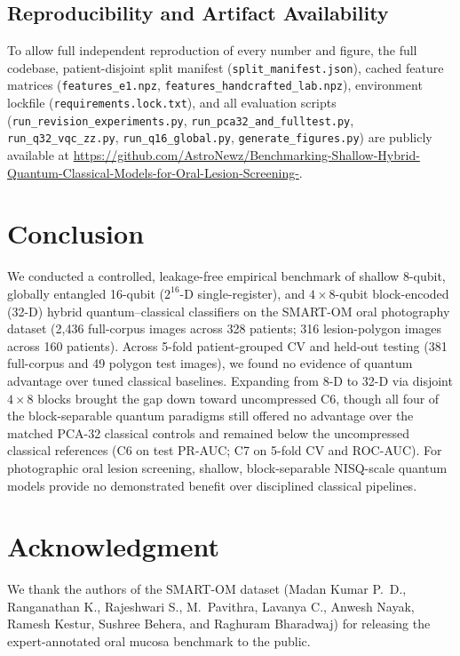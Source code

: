 \documentclass[conference]{IEEEtran}
\begin{document}
\subsection*{Reproducibility and Artifact Availability}
To allow full independent reproduction of every number and figure, the full codebase, patient-disjoint split manifest (\texttt{split\_manifest.json}), cached feature matrices (\texttt{features\_e1.npz}, \texttt{features\_handcrafted\_lab.npz}), environment lockfile (\texttt{requirements.lock.txt}), and all evaluation scripts (\texttt{run\_revision\_experiments.py}, \texttt{run\_pca32\_and\_fulltest.py}, \texttt{run\_q32\_vqc\_zz.py}, \texttt{run\_q16\_global.py}, \texttt{generate\_figures.py}) are publicly available at \url{https://github.com/AstroNewz/Benchmarking-Shallow-Hybrid-Quantum-Classical-Models-for-Oral-Lesion-Screening-}.

\section{Conclusion}
We conducted a controlled, leakage-free empirical benchmark of shallow 8-qubit, globally entangled 16-qubit ($2^{16}$-D single-register), and $4 \times 8$-qubit block-encoded (32-D) hybrid quantum--classical classifiers on the SMART-OM oral photography dataset (2,436 full-corpus images across 328 patients; 316 lesion-polygon images across 160 patients). Across 5-fold patient-grouped CV and held-out testing (381 full-corpus and 49 polygon test images), we found no evidence of quantum advantage over tuned classical baselines. Expanding from 8-D to 32-D via disjoint $4 \times 8$ blocks brought the gap down toward uncompressed C6, though all four of the block-separable quantum paradigms still offered no advantage over the matched PCA-32 classical controls and remained below the uncompressed classical references (C6 on test PR-AUC; C7 on 5-fold CV and ROC-AUC). For photographic oral lesion screening, shallow, block-separable NISQ-scale quantum models provide no demonstrated benefit over disciplined classical pipelines.

\section*{Acknowledgment}
We thank the authors of the SMART-OM dataset (Madan Kumar P.\ D., Ranganathan K., Rajeshwari S., M.\ Pavithra, Lavanya C., Anwesh Nayak, Ramesh Kestur, Sushree Behera, and Raghuram Bharadwaj) for releasing the expert-annotated oral mucosa benchmark to the public.

\balance


\end{document}
